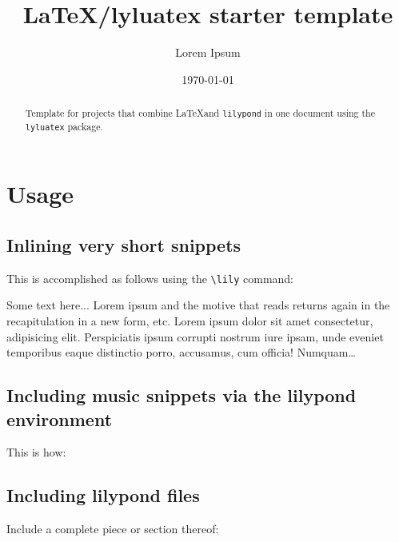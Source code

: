 \documentclass{article}
\title{LaTeX/lyluatex starter template}
\author{Lorem Ipsum}
\date{\today}
\begin{document}
  \maketitle

  \begin{abstract}
    Template for projects that combine \LaTeX and \verb|lilypond| in one document using the \verb|lyluatex| package.
  \end{abstract}

  \section{Usage}
    \subsection{Inlining very short snippets}
      This is accomplished as follows using the \verb|\lily| command:

      Some text here... Lorem ipsum and the motive that reads  returns again in the recapitulation in a new form, etc. Lorem ipsum dolor sit amet consectetur, adipisicing elit. Perspiciatis ipsum corrupti nostrum iure ipsam, unde eveniet temporibus eaque distinctio porro, accusamus, cum officia! Numquam\dots

    \subsection{Including music snippets via the lilypond environment}
      This is how:
      \vspace*{1em}

      \begin{center}
      \end{center}
    \subsection{Including lilypond files}  
      Include a complete piece or section thereof:

\end{document}
